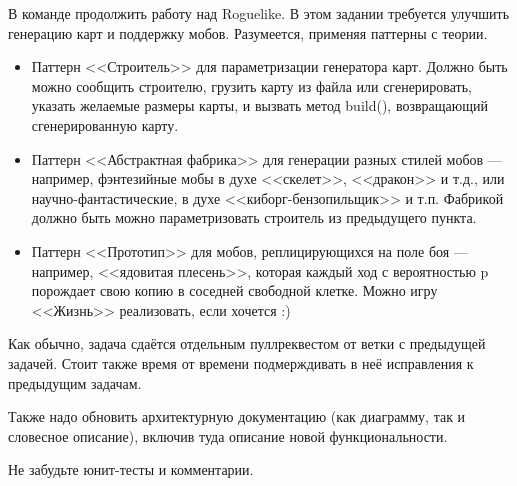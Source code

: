 \documentclass[a5paper]{homework}
\begin{document}

В команде продолжить работу над Roguelike. В этом задании требуется улучшить генерацию карт и поддержку мобов. Разумеется, применяя паттерны с теории.

\begin{itemize}
    \item Паттерн <<Строитель>> для параметризации генератора карт. Должно быть можно сообщить строителю, грузить карту из файла или сгенерировать, указать желаемые размеры карты, и вызвать метод build(), возвращающий сгенерированную карту.
    \item Паттерн <<Абстрактная фабрика>> для генерации разных стилей мобов --- например, фэнтезийные мобы в духе <<скелет>>, <<дракон>> и т.д., или научно-фантастические, в духе <<киборг-бензопильщик>> и т.п. Фабрикой должно быть можно параметризовать строитель из предыдущего пункта.
    \item Паттерн <<Прототип>> для мобов, реплицирующихся на поле боя --- например, <<ядовитая плесень>>, которая каждый ход с вероятностью p порождает свою копию в соседней свободной клетке. Можно игру <<Жизнь>> реализовать, если хочется :)
\end{itemize}

Как обычно, задача сдаётся отдельным пуллреквестом от ветки с предыдущей задачей. Стоит также время от времени подмерждивать в неё исправления к предыдущим задачам.

Также надо обновить архитектурную документацию (как диаграмму, так и словесное описание), включив туда описание новой функциональности.

Не забудьте юнит-тесты и комментарии.
\end{document}
